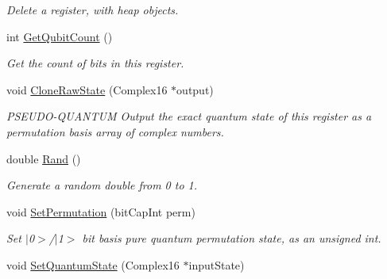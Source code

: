 \begin{DoxyCompactItemize}
\begin{DoxyCompactList}\small\item\em Delete a register, with heap objects. \end{DoxyCompactList}\item 
int \hyperlink{classQrack_1_1Register_aa86f504c48762af45f426610cb42c650}{Get\+Qubit\+Count} ()\hypertarget{classQrack_1_1Register_aa86f504c48762af45f426610cb42c650}{}\label{classQrack_1_1Register_aa86f504c48762af45f426610cb42c650}

\begin{DoxyCompactList}\small\item\em Get the count of bits in this register. \end{DoxyCompactList}\item 
void \hyperlink{classQrack_1_1Register_ade2cbafa292bf9e6d9539f28699648d0}{Clone\+Raw\+State} (Complex16 $\ast$output)\hypertarget{classQrack_1_1Register_ade2cbafa292bf9e6d9539f28699648d0}{}\label{classQrack_1_1Register_ade2cbafa292bf9e6d9539f28699648d0}

\begin{DoxyCompactList}\small\item\em P\+S\+E\+U\+D\+O-\/\+Q\+U\+A\+N\+T\+UM Output the exact quantum state of this register as a permutation basis array of complex numbers. \end{DoxyCompactList}\item 
double \hyperlink{classQrack_1_1Register_a9c6df1efc7388aa10c070e86e164b6ca}{Rand} ()\hypertarget{classQrack_1_1Register_a9c6df1efc7388aa10c070e86e164b6ca}{}\label{classQrack_1_1Register_a9c6df1efc7388aa10c070e86e164b6ca}

\begin{DoxyCompactList}\small\item\em Generate a random double from 0 to 1. \end{DoxyCompactList}\item 
void \hyperlink{classQrack_1_1Register_a79bf26b68cd549d87e719a8868568040}{Set\+Permutation} (bit\+Cap\+Int perm)\hypertarget{classQrack_1_1Register_a79bf26b68cd549d87e719a8868568040}{}\label{classQrack_1_1Register_a79bf26b68cd549d87e719a8868568040}

\begin{DoxyCompactList}\small\item\em Set $\vert$0$>$/$\vert$1$>$ bit basis pure quantum permutation state, as an unsigned int. \end{DoxyCompactList}\item 
void \hyperlink{classQrack_1_1Register_a1756c6bb26d19f2f5bc991db3025b08e}{Set\+Quantum\+State} (Complex16 $\ast$input\+State)\hypertarget{classQrack_1_1Register_a1756c6bb26d19f2f5bc991db3025b08e}{}\label{classQrack_1_1Register_a1756c6bb26d19f2f5bc991db3025b08e}


\end{DoxyCompactItemize}
